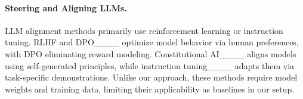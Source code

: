 \paragraph{Steering and Aligning LLMs.}  
LLM alignment methods primarily use reinforcement learning or instruction tuning. RLHF and DPO____ optimize model behavior via human preferences, with DPO eliminating reward modeling. Constitutional AI____ aligns models using self-generated principles, while instruction tuning____ adapts them via task-specific demonstrations. Unlike our approach, these methods require model weights and training data, limiting their applicability as baselines in our setup. 





